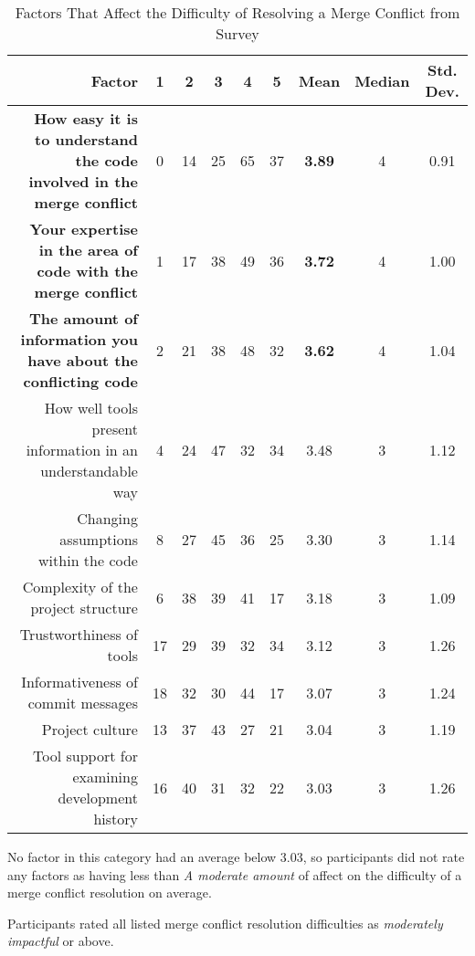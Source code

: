 \begin{table*}[!]
\renewcommand{\arraystretch}{1.3}
\caption{Factors That Affect the Difficulty of Resolving a Merge Conflict from Survey}
\label{survey_res_diffs}
\centering
\begin{tabularx}{0.9\textwidth}{r | *5{c} | *3{c}}

\toprule
	Factor & 1 & 2 & 3 & 4 & 5 & Mean & Median & Std. Dev. \\
\midrule
	\textbf{How easy it is to understand the code involved in the merge conflict} & 0 & 14 & 25 & 65 & 37 & \textbf{3.89} & 4 & 0.91\\
	\textbf{Your expertise in the area of code with the merge conflict} & 1 & 17 & 38 & 49 & 36 & \textbf{3.72} & 4 & 1.00\\
	\textbf{The amount of information you have about the conflicting code} & 2 & 21 & 38 & 48 & 32 & \textbf{3.62} & 4 & 1.04\\
	How well tools present information in an understandable way & 4 & 24 & 47 & 32 & 34 & 3.48 & 3 & 1.12\\
	Changing assumptions within the code & 8 & 27 & 45 & 36 & 25 & 3.30 & 3 & 1.14\\
	Complexity of the project structure & 6 & 38 & 39 & 41 & 17 & 3.18 & 3 & 1.09\\
	Trustworthiness of tools & 17 & 29 & 39 & 32 & 34 & 3.12 & 3 & 1.26\\
	Informativeness of commit messages & 18 & 32 & 30 & 44 & 17 & 3.07 & 3 & 1.24\\
	Project culture & 13 & 37 & 43 & 27 & 21 & 3.04 & 3 & 1.19\\
	Tool support for examining development history & 16 & 40 & 31 & 32 & 22 & 3.03 & 3 & 1.26\\
\bottomrule
\end{tabularx}
\end{table*}

No factor in this category had an average below 3.03, so participants did not rate any factors as having less than \textit{A moderate amount} of affect on the difficulty of a merge conflict resolution on average.
\begin{tcolorbox}[enhanced,minipage boxed title,enhanced,title={Takeaway \arabic{takeawaycounter}},
attach boxed title to top left=
{xshift=0mm,yshift=-1mm},
boxed title style={size=small}]
Participants rated all listed merge conflict resolution difficulties as \textit{moderately impactful} or above.
\end{tcolorbox}
\addtocounter{takeawaycounter}{1}

